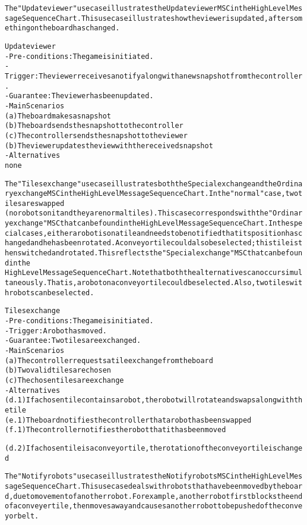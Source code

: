 \begin{alltt}
The "Update viewer" use case illustrates the Update viewer MSC in the High Level Message Sequence Chart. This use case illustrates how the viewer is updated, after something on the board has changed. 

Update viewer
- Pre-conditions: The game is initiated.
- Trigger: The viewer receives a notify along with a new snapshot from the controller.
- Guarantee: The viewer has been updated.
- Main Scenarios
    (a) The board makes a snapshot
    (b) The board sends the snapshot to the controller
    (c) The controller sends the snapshot to the viewer
    (b) The viewer updates the view with the received snapshot
- Alternatives 
    none

The "Tiles exchange" use case illustrates both the Special exchange and the Ordinary exchange MSC in the High Level Message Sequence Chart. In the "normal" case, two tiles are swapped 
(no robots on it and they are normal tiles). This case corresponds with the "Ordinary exchange" MSC that can be found in the High Level Message Sequence Chart. In the special cases, either a robot is on a tile and needs to be notified that its position has changed and he has been rotated. A conveyor tile could also be selected; this tile is then switched and rotated. This reflects the "Special exchange" MSC that can be found in the 
High Level Message Sequence Chart. Note that both the alternatives can occur simultaneously. That is, a robot on a conveyor tile could be selected. Also, two tiles with robots can be selected. 

Tiles exchange
- Pre-conditions: The game is initiated.
- Trigger:  A robot has moved.
- Guarantee: Two tiles are exchanged.
- Main Scenarios
    (a) The controller requests a tile exchange from the board
    (b) Two valid tiles are chosen
    (c) The chosen tiles are exchange
- Alternatives
    (d.1) If a chosen tile contains a robot, the robot will rotate and swaps along with the tile
    (e.1) The board notifies the controller that a robot has been swapped
    (f.1) The controller notifies the robot that it has been moved

    (d.2) If a chosen tile is a conveyor tile, the rotation of the conveyor tile is changed 

The "Notify robots" use case illustrates the Notify robots MSC in the High Level Message Sequence Chart. This use case deals with robots that have been moved by the board, due to movement of another robot. For example, another robot first blocks the end of a conveyer tile, then moves away and causes another robot to be pushed of the conveyor belt. \\


\end{alltt}
